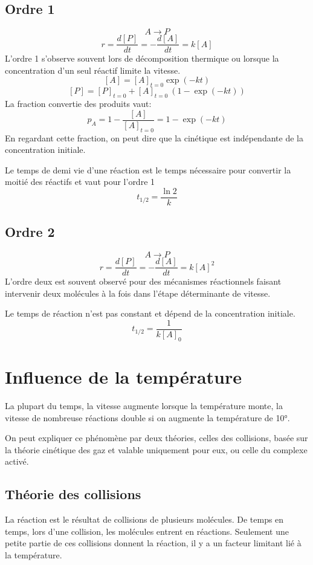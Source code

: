 \subsection{Ordre 1}
\[ A\longrightarrow P \]
\[ r = \frac{d[P]}{dt} = -\frac{d[A]}{dt} = k[A] \]
L'ordre 1 s'observe souvent lors de décomposition thermique ou
lorsque la concentration d'un seul réactif limite la vitesse.
\[ [A] = [A]_{t = 0} \exp(-kt) \]
\[ [P] = [P]_{t = 0}+[A]_{t = 0}\ (1-\exp (-kt)) \]
La fraction convertie des produits vaut:
\[ p_A = 1-\frac{[A]}{[A]_{t = 0}} = 1-\exp (-kt) \]
En regardant cette fraction, on peut dire que la cinétique est
indépendante de la concentration initiale.

Le temps de demi vie d'une réaction est le temps nécessaire
pour convertir la moitié des réactifs et vaut pour l'ordre 1
\[ t_{1/2} = \frac {\ln 2}{k} \]

\subsection{Ordre 2}
\[ A\longrightarrow P \]
\[ r = \frac{d[P]}{dt} = -\frac{d[A]}{dt} = k[A]^2 \]
L'ordre deux est souvent observé pour des mécanismes réactionnels faisant
intervenir deux molécules à la fois dans l'étape déterminante de vitesse.

Le temps de réaction n'est pas constant et dépend de la concentration initiale.
\[ t_{1/2} = \frac 1{k[A]_0} \]

\section{Influence de la température}
La plupart du temps, la vitesse augmente lorsque la température monte,
la vitesse de nombreuse réactions double si on augmente la température de 10°.

On peut expliquer ce phénomène par deux théories,
celles des collisions, basée sur la théorie cinétique des gaz et
valable uniquement pour eux, ou celle du complexe activé.

\subsection{Théorie des collisions}
La réaction est le résultat de collisions de plusieurs molécules.
De temps en temps, lors d'une collision, les molécules entrent en réactions.
Seulement une petite partie de ces collisions donnent la réaction,
il y a un facteur limitant lié à la température.

